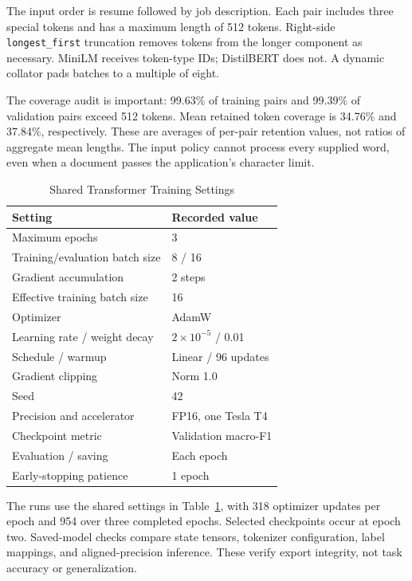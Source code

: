 \documentclass[conference,a4paper]{IEEEtran}
\begin{document}
The input order is resume followed by job description. Each pair includes three special tokens and has a maximum length of 512 tokens. Right-side \texttt{longest\_first} truncation removes tokens from the longer component as necessary. MiniLM receives token-type IDs; DistilBERT does not. A dynamic collator pads batches to a multiple of eight.

The coverage audit is important: 99.63\% of training pairs and 99.39\% of validation pairs exceed 512 tokens. Mean retained token coverage is 34.76\% and 37.84\%, respectively. These are averages of per-pair retention values, not ratios of aggregate mean lengths. The input policy cannot process every supplied word, even when a document passes the application's character limit.

\begin{table}[t]
\caption{Shared Transformer Training Settings}
\label{tab:training}
\centering\footnotesize
\begin{tabular}{ll}
\toprule
Setting & Recorded value\\
\midrule
Maximum epochs & 3\\
Training/evaluation batch size & 8 / 16\\
Gradient accumulation & 2 steps\\
Effective training batch size & 16\\
Optimizer & AdamW\\
Learning rate / weight decay & $2\times10^{-5}$ / 0.01\\
Schedule / warmup & Linear / 96 updates\\
Gradient clipping & Norm 1.0\\
Seed & 42\\
Precision and accelerator & FP16, one Tesla T4\\
Checkpoint metric & Validation macro-F1\\
Evaluation / saving & Each epoch\\
Early-stopping patience & 1 epoch\\
\bottomrule
\end{tabular}
\end{table}

The runs use the shared settings in Table~\ref{tab:training}, with 318 optimizer updates per epoch and 954 over three completed epochs. Selected checkpoints occur at epoch two. Saved-model checks compare state tensors, tokenizer configuration, label mappings, and aligned-precision inference. These verify export integrity, not task accuracy or generalization.
\end{document}
